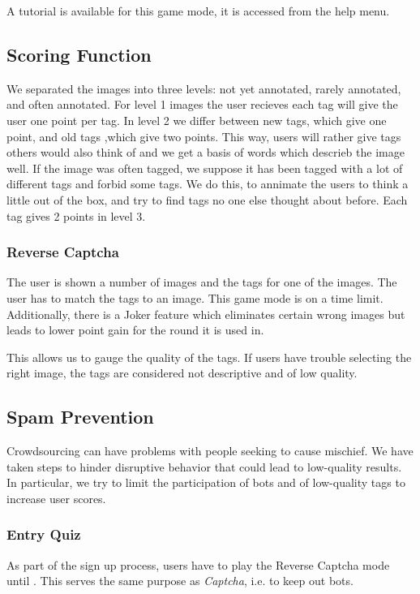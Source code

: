 A tutorial is available for this game mode, it is accessed from the help menu.

\subsection{Scoring Function}
\label{g14:sec:concepts:scoring function}
We separated the images into three levels: not yet annotated, rarely annotated, and often annotated. For level 1 images the user recieves each tag will give the user one point per tag. In level 2 we differ between new tags, which give one point, and old tags ,which give two points. This way, users will rather give tags others would also think of and we get a basis of words which descrieb the image well. If the image was often tagged, we suppose it has been tagged with a lot of different tags and forbid some tags. We do this, to annimate the users to think a little out of the box, and try to find tags no one else thought about before. Each tag gives 2 points in level 3.

\subsubsection{Reverse Captcha}

The user is shown a number of images and the tags for one of the images. The user has to match the tags to an image.
This game mode is on a time limit. Additionally, there is a Joker feature which eliminates certain wrong images but leads to lower point gain for the round it is used in.

This allows us to gauge the quality of the tags. If users have trouble selecting the right image, the tags are considered not descriptive and of low quality.


\subsection{Spam Prevention}
Crowdsourcing can have problems with people seeking to cause mischief. We have taken steps to hinder disruptive behavior that could lead to low-quality results. In particular, we try to limit the participation of bots and  of low-quality tags to increase user scores.


\subsubsection{Entry Quiz}
As part of the sign up process, users have to play the Reverse Captcha mode until . This serves the same purpose as \textit{Captcha}, i.e. to keep out bots.


